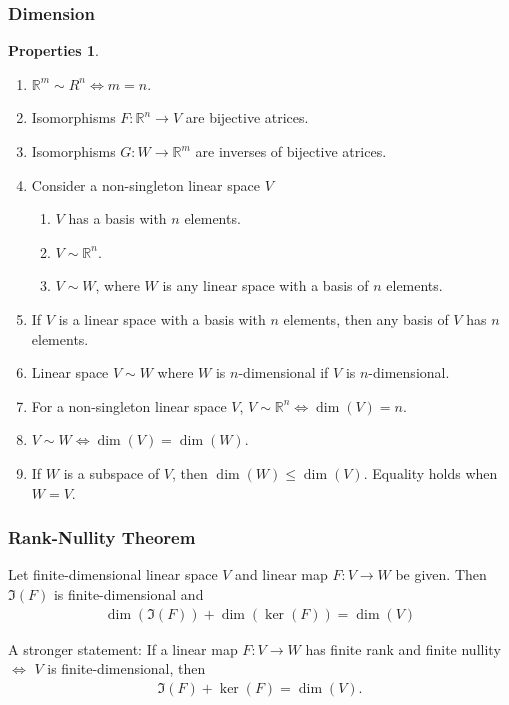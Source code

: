 \documentclass{article}
\theoremstyle{definition}
\newtheorem{prop}{Properties}[section]
\newcommand{\R}{\mathbb{R}}
\begin{document}
\subsubsection{Dimension}
\begin{prop}
	$\,$
	\begin{enumerate}
		\item $\R^m \sim R^n \iff m=n$.
		\item Isomorphisms $F : \R^n \rightarrow V$ are bijective atrices.
		\item Isomorphisms $G : W \rightarrow \R^m$ are inverses of bijective atrices.
		\item Consider a non-singleton linear space $V$
		\begin{enumerate}
			\item $V$ has a basis with $n$ elements.
			\item $V \sim \R^n$.
			\item $V \sim W$, where $W$ is any linear space with a basis of $n$ elements.
		\end{enumerate}
		\item If $V$ is a linear space with a basis with $n$ elements, then any basis of $V$ has $n$ elements.
		\item Linear space $V \sim W$ where $W$ is $n$-dimensional if $V$ is $n$-dimensional.
		\item For a non-singleton linear space $V$, $V\sim \R^n \iff \dim(V) = n$.
		\item $V \sim W \iff \dim(V) = \dim(W)$.
		\item If $W$ is a subspace of $V$, then $\dim(W)\leq \dim(V)$. Equality holds when $W = V$.
	\end{enumerate}
\end{prop}
\subsubsection{Rank-Nullity Theorem}
Let finite-dimensional linear space $V$ and linear map $F : V \rightarrow W$ be given. Then $\Im(F)$ is finite-dimensional and 
\begin{align*}
\dim(\Im(F)) + \dim(\ker(F)) = \dim(V)
\end{align*}

A stronger statement: If a linear map $F : V\rightarrow W$ has finite rank and finite nullity $\iff$ $V$ is finite-dimensional, then
\begin{align*}
\Im(F) + \ker(F) = \dim(V).
\end{align*}
\end{document}
